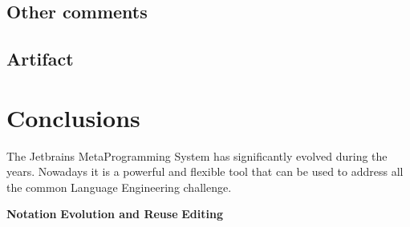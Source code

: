 \documentclass[preprint,numbers,10pt]{sigplanconf}
\begin{document}
\subsection{Other comments}

\subsection{Artifact}

%
%

\section{Conclusions}

The Jetbrains MetaProgramming System has significantly evolved during the years. Nowadays it is a powerful and flexible tool that can be used to address all the common Language Engineering challenge.

\textbf{Notation}
\textbf{Evolution and Reuse}
\textbf{Editing}



\end{document}
